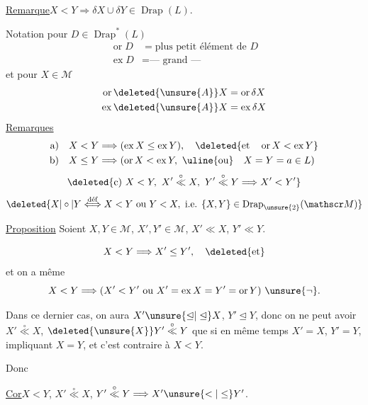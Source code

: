 \uline{Remarque}\quad $X<Y\Longrightarrow\delta X\cup\delta Y\in\operatorname{Drap}(L)$.

Notation pour $D\in\operatorname{Drap}^*(L)$
\[
\begin{aligned}
\operatorname{or}D&=\text{plus petit élément de }D\\
\operatorname{ex}D&=\text{--- grand ---}
\end{aligned}
\]
et  pour $X\in\mathscr M$
\[
\begin{aligned}
\operatorname{or}\deleted{\unsure{A}}X&=\operatorname{or}\delta X\\
\operatorname{ex}\deleted{\unsure{A}}X&=\operatorname{ex}\delta X
\end{aligned}
\]
\uline{Remarques}
\[
\begin{aligned}
\text{a)}\quad X<Y&\Longrightarrow(\operatorname{ex}X\leq\operatorname{ex}Y),\quad\deleted{\text{et}\quad\operatorname{or}X<\operatorname{ex}Y}\\
\text{b)}\quad X\leq Y&\Longrightarrow(\operatorname{or}X<\operatorname{ex}Y,\ \text{\uline{ou}}\quad X=Y=a\in L)
\end{aligned}
\]
\[
\deleted{\text{c)}\ X<Y,\ X'\overset{\circ}{\ll}X,\ Y'\overset{\circ}{\ll}Y\Longrightarrow X'<Y'}
\]
\[
\deleted{X|\circ|Y\overset{\mathrm{d\acute ef}}{\Longleftrightarrow}X<Y\text{ ou }Y<X,\text{ i.e. }\{X,Y\}\in\operatorname{Drap}_{\unsure{2}}(\mathscr M)}
\]

\uline{Proposition} Soient $X,Y\in\mathscr M$, $X',Y'\in\mathscr M$, $X'\ll X$, $Y'\ll Y$.

 
\[
X<Y\Longrightarrow X'\leq Y',\quad\deleted{\text{et}}
\]
et on a même
\[
X<Y\Longrightarrow(X'<Y'\text{ ou }X'=\operatorname{ex}X=Y'=\operatorname{or}Y)\ \unsure{\neg}.
\]

Dans ce dernier cas, on aura $X'\unsure{\unlhd|\trianglelefteq} X$, $Y'\unlhd Y$, donc on ne peut avoir $X'\overset{\circ}{\ll}X$, $\deleted{\unsure{X}}Y'\overset{\circ}{\ll}Y$ que si en même temps $X'=X$, $Y'=Y$,    impliquant $X=Y$, et c'est  contraire à $X<Y$.

Donc

\uline{Cor}\quad $X<Y$, $X'\overset{\circ}{\ll}X$, $Y'\overset{\circ}{\ll}Y\Longrightarrow X'\unsure{<|\leq}Y'$.

